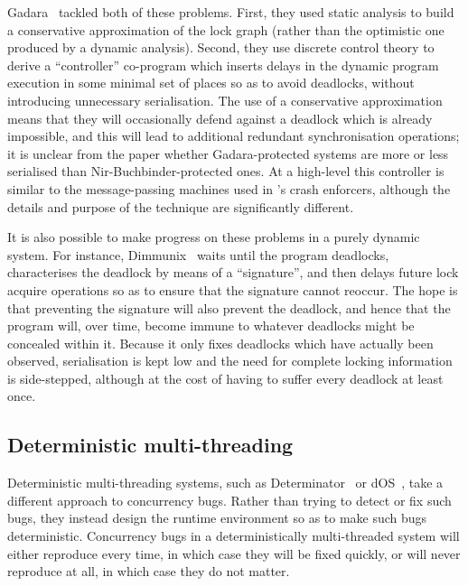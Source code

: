 Gadara~\cite{FFFWang2008} tackled both of these problems.  First, they
used static analysis to build a conservative approximation of the lock
graph (rather than the optimistic one produced by a dynamic analysis).
Second, they use discrete control theory to derive a ``controller''
co-program which inserts delays in the dynamic program execution in
some minimal set of places so as to avoid deadlocks, without
introducing unnecessary serialisation.  The use of a conservative
approximation means that they will occasionally defend against a
deadlock which is already impossible, and this will lead to additional
redundant synchronisation operations; it is unclear from the paper
whether Gadara-protected systems are more or less serialised than
Nir-Buchbinder-protected ones.  At a high-level this controller is
similar to the message-passing machines used in {\technique}'s crash
enforcers, although the details and purpose of the technique are
significantly different.

It is also possible to make progress on these problems in a purely
dynamic system.  For instance, Dimmunix~\cite{Jula2008} waits until
the program deadlocks, characterises the deadlock by means of a
``signature'', and then delays future lock acquire operations so as to
ensure that the signature cannot reoccur.  The hope is that preventing
the signature will also prevent the deadlock, and hence that the
program will, over time, become immune to whatever deadlocks might be
concealed within it.  Because it only fixes deadlocks which have
actually been observed, serialisation is kept low and the need for
complete locking information is side-stepped, although at the cost of
having to suffer every deadlock at least once.

\subsection{Deterministic multi-threading}

Deterministic multi-threading systems, such as
Determinator~\cite{Aviram2010} or dOS~\cite{Bergan2010}, take a
different approach to concurrency bugs.  Rather than trying to detect
or fix such bugs, they instead design the runtime environment so as to
make such bugs deterministic.  Concurrency bugs in a deterministically
multi-threaded system will either reproduce every time, in which case
they will be fixed quickly, or will never reproduce at all, in which
case they do not matter.

